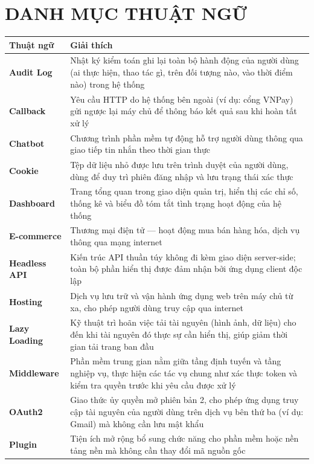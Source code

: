 \documentclass[../DoAn.tex]{subfiles}
\begin{document}
\chapter*{DANH MỤC THUẬT NGỮ}
\begin{longtable}{l p{14cm}}
	\hline
   \textbf{Thuật ngữ}  & \textbf{Giải thích} \\ \hline
	\textbf{Audit Log} & Nhật ký kiểm toán ghi lại toàn bộ hành động của người dùng (ai thực hiện, thao tác gì, trên đối tượng nào, vào thời điểm nào) trong hệ thống \\
	\textbf{Callback} & Yêu cầu HTTP do hệ thống bên ngoài (ví dụ: cổng VNPay) gửi ngược lại máy chủ để thông báo kết quả sau khi hoàn tất xử lý \\
	\textbf{Chatbot} & Chương trình phần mềm tự động hỗ trợ người dùng thông qua giao tiếp tin nhắn theo thời gian thực \\
	\textbf{Cookie} & Tệp dữ liệu nhỏ được lưu trên trình duyệt của người dùng, dùng để duy trì phiên đăng nhập và lưu trạng thái xác thực \\
	\textbf{Dashboard} & Trang tổng quan trong giao diện quản trị, hiển thị các chỉ số, thống kê và biểu đồ tóm tắt tình trạng hoạt động của hệ thống \\
	\textbf{E-commerce} & Thương mại điện tử — hoạt động mua bán hàng hóa, dịch vụ thông qua mạng internet \\
	\textbf{Headless API} & Kiến trúc API thuần túy không đi kèm giao diện server-side; toàn bộ phần hiển thị được đảm nhận bởi ứng dụng client độc lập \\
	\textbf{Hosting} & Dịch vụ lưu trữ và vận hành ứng dụng web trên máy chủ từ xa, cho phép người dùng truy cập qua internet \\
	\textbf{Lazy Loading} & Kỹ thuật trì hoãn việc tải tài nguyên (hình ảnh, dữ liệu) cho đến khi tài nguyên đó thực sự cần hiển thị, giúp giảm thời gian tải trang ban đầu \\
	\textbf{Middleware} & Phần mềm trung gian nằm giữa tầng định tuyến và tầng nghiệp vụ, thực hiện các tác vụ chung như xác thực token và kiểm tra quyền trước khi yêu cầu được xử lý \\
	\textbf{OAuth2} & Giao thức ủy quyền mở phiên bản 2, cho phép ứng dụng truy cập tài nguyên của người dùng trên dịch vụ bên thứ ba (ví dụ: Gmail) mà không cần lưu mật khẩu \\
	\textbf{Plugin} & Tiện ích mở rộng bổ sung chức năng cho phần mềm hoặc nền tảng nền mà không cần thay đổi mã nguồn gốc \\

\end{longtable}
\end{document}
